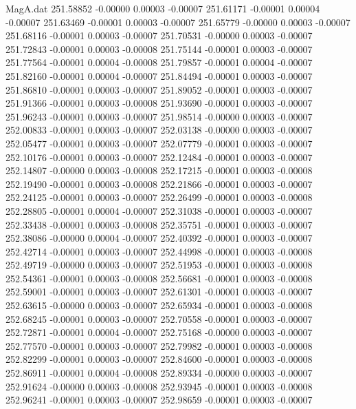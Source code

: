 \begin{filecontents}{MagA.dat}
 251.58852   -0.00000    0.00003   -0.00007
 251.61171   -0.00001    0.00004   -0.00007
 251.63469   -0.00001    0.00003   -0.00007
 251.65779   -0.00000    0.00003   -0.00007
 251.68116   -0.00001    0.00003   -0.00007
 251.70531   -0.00000    0.00003   -0.00007
 251.72843   -0.00001    0.00003   -0.00008
 251.75144   -0.00001    0.00003   -0.00007
 251.77564   -0.00001    0.00004   -0.00008
 251.79857   -0.00001    0.00004   -0.00007
 251.82160   -0.00001    0.00004   -0.00007
 251.84494   -0.00001    0.00003   -0.00007
 251.86810   -0.00001    0.00003   -0.00007
 251.89052   -0.00001    0.00003   -0.00007
 251.91366   -0.00001    0.00003   -0.00008
 251.93690   -0.00001    0.00003   -0.00007
 251.96243   -0.00001    0.00003   -0.00007
 251.98514   -0.00000    0.00003   -0.00007
 252.00833   -0.00001    0.00003   -0.00007
 252.03138   -0.00000    0.00003   -0.00007
 252.05477   -0.00001    0.00003   -0.00007
 252.07779   -0.00001    0.00003   -0.00007
 252.10176   -0.00001    0.00003   -0.00007
 252.12484   -0.00001    0.00003   -0.00007
 252.14807   -0.00000    0.00003   -0.00008
 252.17215   -0.00001    0.00003   -0.00008
 252.19490   -0.00001    0.00003   -0.00008
 252.21866   -0.00001    0.00003   -0.00007
 252.24125   -0.00001    0.00003   -0.00007
 252.26499   -0.00001    0.00003   -0.00008
 252.28805   -0.00001    0.00004   -0.00007
 252.31038   -0.00001    0.00003   -0.00007
 252.33438   -0.00001    0.00003   -0.00008
 252.35751   -0.00001    0.00003   -0.00007
 252.38086   -0.00000    0.00004   -0.00007
 252.40392   -0.00001    0.00003   -0.00007
 252.42714   -0.00001    0.00003   -0.00007
 252.44998   -0.00001    0.00003   -0.00008
 252.49719   -0.00000    0.00003   -0.00007
 252.51953   -0.00001    0.00003   -0.00008
 252.54361   -0.00001    0.00003   -0.00008
 252.56681   -0.00001    0.00003   -0.00008
 252.59001   -0.00001    0.00003   -0.00007
 252.61301   -0.00001    0.00003   -0.00007
 252.63615   -0.00000    0.00003   -0.00007
 252.65934   -0.00001    0.00003   -0.00008
 252.68245   -0.00001    0.00003   -0.00007
 252.70558   -0.00001    0.00003   -0.00007
 252.72871   -0.00001    0.00004   -0.00007
 252.75168   -0.00000    0.00003   -0.00007
 252.77570   -0.00001    0.00003   -0.00007
 252.79982   -0.00001    0.00003   -0.00008
 252.82299   -0.00001    0.00003   -0.00007
 252.84600   -0.00001    0.00003   -0.00008
 252.86911   -0.00001    0.00004   -0.00008
 252.89334   -0.00000    0.00003   -0.00007
 252.91624   -0.00000    0.00003   -0.00008
 252.93945   -0.00001    0.00003   -0.00008
 252.96241   -0.00001    0.00003   -0.00007
 252.98659   -0.00001    0.00003   -0.00007

\end{filecontents}
